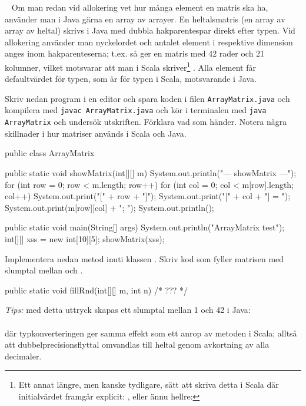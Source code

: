 \QUESTEND





\QUESTBEGIN

\Task \label{task:arraymatrix-java} \what~   Om man redan vid allokering vet hur många element en matris ska ha, använder man i Java gärna en array av arrayer. En heltalsmatris (en array av array av heltal) skrivs i Java med dubbla hakparentespar  direkt efter typen. Vid allokering använder man nyckelordet  och antalet element i respektive dimension anges inom hakparenteserna; t.ex. så ger  en matris med 42 rader och 21 kolumner, vilket motsvarar att man i Scala skriver\footnote{Ett annat längre, men kanske tydligare, sätt att skriva detta i Scala där initialvärdet framgår explicit: , eller ännu hellre: }  . Alla element får defaultvärdet för typen, som är  för typen  i Scala, motsvarande  i Java.

\Subtask Skriv nedan program i en editor och spara koden i filen \texttt{ArrayMatrix.java} och kompilera med \texttt{javac ArrayMatrix.java} och kör i terminalen med \texttt{java ArrayMatrix} och undersök utskriften. Förklara vad som händer. Notera några skillnader i hur matriser används i Scala och Java.


\begin{Code}[language=Java]
public class ArrayMatrix {

    public static void showMatrix(int[][] m){
        System.out.println("\n--- showMatrix ---");
        for (int row = 0; row < m.length; row++){
            for (int col = 0; col < m[row].length; col++) {
                System.out.print("[" + row + "]");
                System.out.print("[" + col + "] = ");
                System.out.print(m[row][col] + "; ");
            }
            System.out.println();
        }
    }

    public static void main(String[] args) {
        System.out.println("ArrayMatrix test");
        int[][] xss = new int[10][5];
        showMatrix(xss);
    }
}
\end{Code}

\Subtask Implementera nedan metod  inuti klassen . Skriv kod som fyller matrisen  med slumptal mellan  och .
\begin{Code}[language=Java]
    public static void fillRnd(int[][] m, int n){
        /* ??? */
    }
\end{Code}
\noindent \emph{Tips:} med detta uttryck skapas ett slumptal mellan 1 och 42 i Java:\\
 \\
där typkonverteringen  ger samma effekt som ett anrop av metoden  i Scala; alltså att dubbelprecisionsflyttal omvandlas till heltal genom avkortning av alla decimaler.


